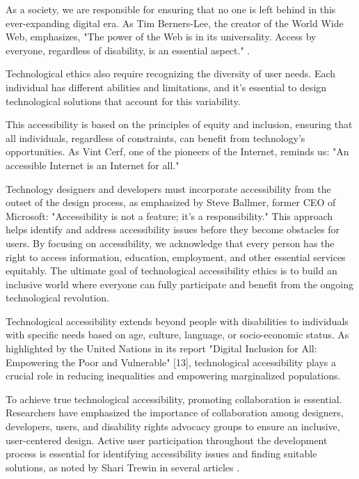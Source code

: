 As a society, we are responsible for ensuring that no one is left behind in this ever-expanding digital era. As Tim Berners-Lee, the creator of the World Wide Web, emphasizes, "The power of the Web is in its universality. Access by everyone, regardless of disability, is an essential aspect." \cite{initiative_wai_introduction_nodate}.

Technological ethics also require recognizing the diversity of user needs. Each individual has different abilities and limitations, and it’s essential to design technological solutions that account for this variability.

This accessibility is based on the principles of equity and inclusion, ensuring that all individuals, regardless of constraints, can benefit from technology’s opportunities. As Vint Cerf, one of the pioneers of the Internet, reminds us: "An accessible Internet is an Internet for all."

Technology designers and developers must incorporate accessibility from the outset of the design process, as emphasized by Steve Ballmer, former CEO of Microsoft: "Accessibility is not a feature; it's a responsibility." This approach helps identify and address accessibility issues before they become obstacles for users. By focusing on accessibility, we acknowledge that every person has the right to access information, education, employment, and other essential services equitably. The ultimate goal of technological accessibility ethics is to build an inclusive world where everyone can fully participate and benefit from the ongoing technological revolution.

Technological accessibility extends beyond people with disabilities to individuals with specific needs based on age, culture, language, or socio-economic status. As highlighted by the United Nations in its report "Digital Inclusion for All: Empowering the Poor and Vulnerable" [13], technological accessibility plays a crucial role in reducing inequalities and empowering marginalized populations.

To achieve true technological accessibility, promoting collaboration is essential. Researchers have emphasized the importance of collaboration among designers, developers, users, and disability rights advocacy groups to ensure an inclusive, user-centered design. Active user participation throughout the development process is essential for identifying accessibility issues and finding suitable solutions, as noted by Shari Trewin in several articles \cite{trewin_accessibility_2010}\cite{noauthor_physical_nodate}.

